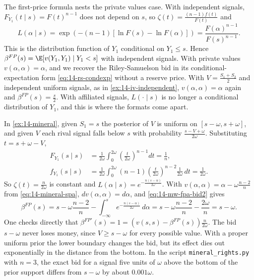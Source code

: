 The first-price formula nests the private values case. With independent signals, $F_{Y_1}(t\mid s)=F(t)^{n-1}$
does not depend on $s$, so $\zeta(t)=\frac{(n-1)f(t)}{F(t)}$ and
\begin{equation*}
  L(\alpha\mid s)=\exp\left(-(n-1)\left[\ln F(s)-\ln F(\alpha)\right]\right)=\frac{F(\alpha)^{n-1}}{F(s)^{n-1}}.
\end{equation*}
This is the distribution function of $Y_1$ conditional on $Y_1\le s$. Hence $\beta^{FP}(s)=\E[v(Y_1,Y_1)\mid
Y_1<s]$ with independent signals. With private values $v(\alpha,\alpha)=\alpha$, and we recover the
Riley-Samuelson bid in its conditional-expectation form \eqref{eq:14-rs-condexp} without a reserve price. With
$V=\frac{S_1+S_2}{2}$ and independent uniform signals, as in \cref{ex:14-iv-independent}, $v(\alpha,\alpha)=\alpha$ again
and $\beta^{FP}(s)=\frac{s}{2}$. With affiliated signals, $L(\cdot\mid s)$ is no longer a conditional
distribution of $Y_1$, and this is where the formats come apart.

\begin{example}\label{ex:14-mineral-fpa}
In \cref{ex:14-mineral}, given $S_1=s$ the posterior of $V$ is uniform on $[s-\omega,s+\omega]$, and given $V$
each rival signal falls below $s$ with probability $\frac{s-V+\omega}{2\omega}$. Substituting
$t=s+\omega-V$,
\begin{align*}
  F_{Y_1}(s\mid s)&=\frac{1}{2\omega}\int_0^{2\omega}\left(\frac{t}{2\omega}\right)^{n-1}dt=\frac{1}{n},\\
  f_{Y_1}(s\mid s)&=\frac{1}{2\omega}\int_0^{2\omega}(n-1)\left(\frac{t}{2\omega}\right)^{n-2}\frac{1}{2\omega}\,dt
  =\frac{1}{2\omega}.
\end{align*}
So $\zeta(t)=\frac{n}{2\omega}$ is constant and $L(\alpha\mid s)=e^{-\frac{n(s-\alpha)}{2\omega}}$. With
$v(\alpha,\alpha)=\alpha-\omega\frac{n-2}{n}$ from \eqref{eq:14-mineral-spa}, $dv(\alpha,\alpha)=d\alpha$, and
\eqref{eq:14-mw-fpa-bid2} gives
\begin{equation}\label{eq:14-mineral-fpa}
  \beta^{FP}(s)=s-\omega\frac{n-2}{n}-\int_{-\infty}^se^{-\frac{n(s-\alpha)}{2\omega}}\,d\alpha
  =s-\omega\frac{n-2}{n}-\frac{2\omega}{n}=s-\omega.
\end{equation}
One checks directly that $\beta^{FP\prime}(s)=1=\left(v(s,s)-\beta^{FP}(s)\right)\frac{n}{2\omega}$. The bid
$s-\omega$ never loses money, since $V\ge s-\omega$ for every possible value. With a proper uniform prior the
lower boundary changes the bid, but its effect dies out exponentially in the distance from the bottom. In the
script \texttt{mineral\_rights.py} with $n=3$, the exact bid for a signal five units of $\omega$ above the
bottom of the prior support differs from $s-\omega$ by about $0.001\omega$.
\end{example}


